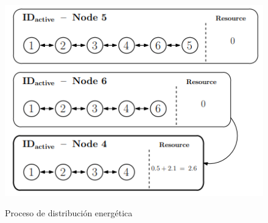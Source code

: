\begin{figure}[h!]
\begin{minipage}{0.5\textwidth}
    \includegraphics[width=\linewidth]{img/teoria/distri3.png}
    \label{fig:distri3}
  \end{minipage}
  \caption{Proceso de distribución energética \cite{den2ne}}
  \label{fig:distri}
\end{figure}

